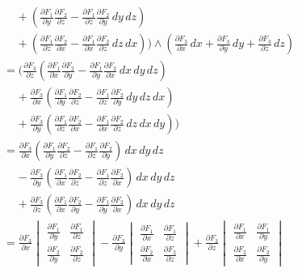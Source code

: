 \documentclass{article}
\newcommand{\partis}[2]{\frac{\partial #2}{\partial #1}}
\begin{document}
\begin{enumerate}
\begin{enumerate}
\begin{align*}
                &\; \; \; \; 
                + (\partis{y}{F_1} \partis{z}{F_2} 
                - \partis{z}{F_1} \partis{y}{F_2} \, dy \, dz) \\
                &\; \; \; \; 
                + (\partis{z}{F_1} \partis{x}{F_2} 
                - \partis{x}{F_1} \partis{z}{F_2} \, dz \, dx ))
                \wedge (\partis{x}{F_3} \, dx 
                + \partis{y}{F_3} \, dy 
                + \partis{z}{F_3} \, dz) \\
                &= (\partis{z}{F_3} (\partis{x}{F_1} \partis{y}{F_2} 
                - \partis{y}{F_1} \partis{x}{F_2}\, dx \, dy \, dz) \\
                &\; \; \; \; 
                + \partis{x}{F_3} (\partis{y}{F_1} \partis{z}{F_2} 
                - \partis{z}{F_1} \partis{y}{F_2} \, dy \, dz \, dx) \\
                &\; \; \; \; 
                + \partis{y}{F_3} (\partis{z}{F_1} \partis{x}{F_2} 
                - \partis{x}{F_1} \partis{z}{F_2} \, dz \, dx \, dy)) \\
                &=  \partis{x}{F_3} (\partis{y}{F_1} \partis{z}{F_2} 
                - \partis{z}{F_1} \partis{y}{F_2}) \, dx \, dy \, dz \\
                &\; \; \; \; 
                - \partis{y}{F_3} (\partis{x}{F_1} \partis{z}{F_2} 
                - \partis{z}{F_1} \partis{x}{F_2}) \, dx \, dy \, dz \\
                &\; \; \; \; 
                + \partis{z}{F_3} (\partis{x}{F_1} \partis{y}{F_2} 
                - \partis{y}{F_1} \partis{x}{F_2})\, dx \, dy \, dz \\
                &=  \partis{x}{F_3} 
                \begin{vmatrix} \partis{y}{F_1} & \partis{z}{F_1} \\ 
                                \partis{y}{F_2} & \partis{z}{F_2} \end{vmatrix}
                - \partis{y}{F_3} 
                \begin{vmatrix} \partis{x}{F_1} & \partis{z}{F_1} \\ 
                                \partis{x}{F_2} & \partis{z}{F_2} \end{vmatrix}
                + \partis{z}{F_3} 
                \begin{vmatrix} \partis{x}{F_1} & \partis{y}{F_1} \\ 
                                \partis{x}{F_2} & \partis{y}{F_2} \end{vmatrix} 

\end{align*}
\end{enumerate}
\end{enumerate}
\end{document}
